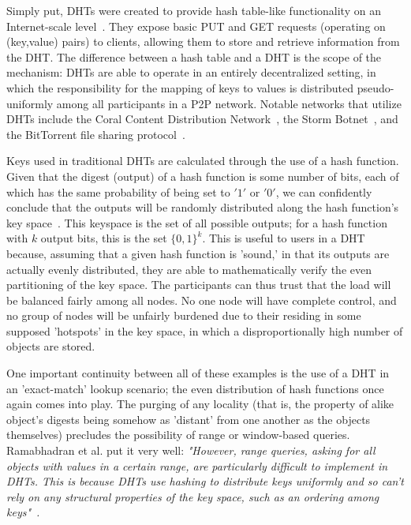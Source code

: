 \documentclass[10pt]{IEEEtran}
\begin{document}
\par Simply put, DHTs were created to provide hash table-like functionality on an Internet-scale level~\cite{Ratnasamy:2001wn}. They expose basic PUT and GET requests (operating on (key,value) pairs) to clients, allowing them to store and retrieve information from the DHT. The difference between a hash table and a DHT is the scope of the mechanism: DHTs are able to operate in an entirely decentralized setting, in which the responsibility for the mapping of keys to values is distributed pseudo-uniformly among all participants in a P2P network. Notable networks that utilize DHTs include the Coral Content Distribution Network~\cite{Freedman:2004vb}, the Storm Botnet~\cite{Holz:2008uk}, and the BitTorrent file sharing protocol~\cite{Cohen:y1_8mBnw}.

\par Keys used in traditional DHTs are calculated through the use of a hash function. Given that the digest (output) of a hash function is some number of bits, each of which has the same probability of being set to $'1'$ or $'0'$, we can confidently conclude that the outputs will be randomly distributed along the hash function's key space~. This keyspace is the set of all possible outputs; for a hash function with $k$ output bits, this is the set $\{0,1\}^k$. This is useful to users in a DHT because, assuming that a given hash function is 'sound,' in that its outputs are actually evenly distributed, they are able to mathematically verify the even partitioning of the key space. The participants can thus trust that the load will be balanced fairly among all nodes. No one node will have complete control, and no group of nodes will be unfairly burdened due to their residing in some supposed 'hotspots' in the key space, in which a disproportionally high number of objects are stored.~

\par One important continuity between all of these examples is the use of a DHT in an 'exact-match' lookup scenario; the even distribution of hash functions once again comes into play. The purging of any locality (that is, the property of alike object's digests being somehow as 'distant' from one another as the objects themselves) precludes the possibility of range or window-based queries. Ramabhadran et al. put it very well: \textit{"However, range queries, asking for all objects with values in a certain range, are particularly difficult to implement in DHTs. This is because DHTs use hashing to distribute keys uniformly and so can't rely on any structural properties of the key space, such as an ordering among keys"}~\cite{Ramabhadran:2004tr}\textit{.}
\end{document}
